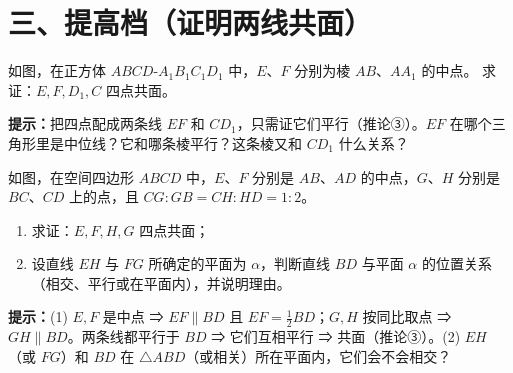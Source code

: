 \documentclass{exam-zh}
\begin{document}
\section*{三、提高档（证明两线共面）}


\begin{problem}[points=10]
    如图，在正方体 $ABCD\text{-}A_1B_1C_1D_1$ 中，$E$、$F$ 分别为棱 $AB$、$AA_1$ 的中点。
求证：$E,F,D_1,C$ 四点共面。

    \begin{hintbox}
\textbf{提示：}把四点配成两条线 $EF$ 和 $CD_1$，只需证它们平行（推论③）。$EF$ 在哪个三角形里是中位线？它和哪条棱平行？这条棱又和 $CD_1$ 什么关系？\end{hintbox}

  \answerarea[56mm]
\end{problem}



\begin{problem}[points=13]
    如图，在空间四边形 $ABCD$ 中，$E$、$F$ 分别是 $AB$、$AD$ 的中点，$G$、$H$ 分别是 $BC$、$CD$ 上的点，且 $CG:GB=CH:HD=1:2$。
\begin{enumerate}[label=(\arabic*)]
  \item 求证：$E,F,H,G$ 四点共面；
  \item 设直线 $EH$ 与 $FG$ 所确定的平面为 $\alpha$，判断直线 $BD$ 与平面 $\alpha$ 的位置关系（相交、平行或在平面内），并说明理由。
\end{enumerate}

    \begin{hintbox}
\textbf{提示：}(1) $E,F$ 是中点 ⇒ $EF\parallel BD$ 且 $EF=\tfrac12BD$；$G,H$ 按同比取点 ⇒ $GH\parallel BD$。两条线都平行于 $BD$ ⇒ 它们互相平行 ⇒ 共面（推论③）。(2) $EH$（或 $FG$）和 $BD$ 在 $\triangle ABD$（或相关）所在平面内，它们会不会相交？\end{hintbox}

  \answerarea[68mm]
\end{problem}
\end{document}
